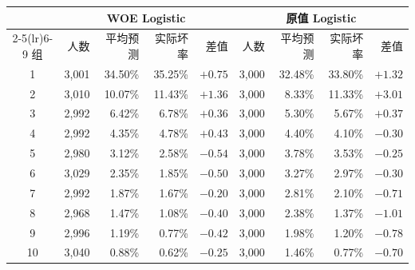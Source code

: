 \begin{tabular}{c rrrr rrrr}
\toprule
& \multicolumn{4}{c}{WOE Logistic} & \multicolumn{4}{c}{原值 Logistic} \\
\cmidrule(lr){2-5}\cmidrule(lr){6-9}
组 & 人数 & 平均预测 & 实际坏率 & 差值 & 人数 & 平均预测 & 实际坏率 & 差值 \\
\midrule
1 & 3,001 & 34.50\% & 35.25\% & $+0.75$ & 3,000 & 32.48\% & 33.80\% & $+1.32$ \\
2 & 3,010 & 10.07\% & 11.43\% & $+1.36$ & 3,000 & 8.33\% & 11.33\% & $+3.01$ \\
3 & 2,992 & 6.42\% & 6.78\% & $+0.36$ & 3,000 & 5.30\% & 5.67\% & $+0.37$ \\
4 & 2,992 & 4.35\% & 4.78\% & $+0.43$ & 3,000 & 4.40\% & 4.10\% & $-0.30$ \\
5 & 2,980 & 3.12\% & 2.58\% & $-0.54$ & 3,000 & 3.78\% & 3.53\% & $-0.25$ \\
6 & 3,029 & 2.35\% & 1.85\% & $-0.50$ & 3,000 & 3.27\% & 2.97\% & $-0.30$ \\
7 & 2,992 & 1.87\% & 1.67\% & $-0.20$ & 3,000 & 2.81\% & 2.10\% & $-0.71$ \\
8 & 2,968 & 1.47\% & 1.08\% & $-0.40$ & 3,000 & 2.38\% & 1.37\% & $-1.01$ \\
9 & 2,996 & 1.19\% & 0.77\% & $-0.42$ & 3,000 & 1.98\% & 1.20\% & $-0.78$ \\
10 & 3,040 & 0.88\% & 0.62\% & $-0.25$ & 3,000 & 1.46\% & 0.77\% & $-0.70$ \\
\bottomrule
\end{tabular}
